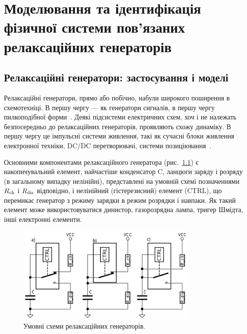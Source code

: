 \chapter{Моделювання та ідентифікація фізичної системи пов'язаних релаксаційних генераторів}

\newcommand{\RelaxBjtIi}{системи з трьох пов'язаних релаксаційних генераторів на парі компліментарних транзисторів}
\newcommand{\RelaxShIi}{системи з трьох пов'язаних релаксаційних генераторів на основі тригерів Шмідта}

\section{Релаксаційні генератори: застосування і моделі}

Релаксаційні генератори, прямо або побічно, набули широкого
поширення в схемотехніці. В першу чергу --- як генератори
сигналів, в першу чергу пилкоподібної форми~\cite{horowitz,
mishenko_du_small_relax}. Деякі підсистеми електричних схем, хоч і
не належать безпосередньо до релаксаційних генераторів,
проявляють схожу динаміку. В першу чергу це імпульсні системи
живлення, такі як сучасні блоки живлення електронної техніки,
DC/DC перетворювачі, системи позиціювання~\cite{atu_st104b}.

Основними компонентами релаксаційного генератора
(рис.~\ref{atu:f:relax_types}) є накопичувальний елемент, найчастіше
конденсатор C, ланцюги заряду і розряду (в загальному випадку
нелінійні), представлені на умовній схемі позначеннями
$ R _\mathrm{ch} $ і
$ R _\mathrm{dis} $ відповідно, і нелінійний (гістерезисний)
елемент (CTRL), що перемикає генератор з режиму зарядки в режим
розрядки і навпаки. Як такий елемент може використовуватися
динистор, газорозрядна лампа, тригер Шмідта, інші електронні елементи.

\begin{figure}[htb!]
  \centerline{\includegraphics[width=0.8\textwidth]{p/relax_types.png} }
\caption{Умовні схеми релаксаційних генераторів.}
\label{atu:f:relax_types}
\end{figure}

